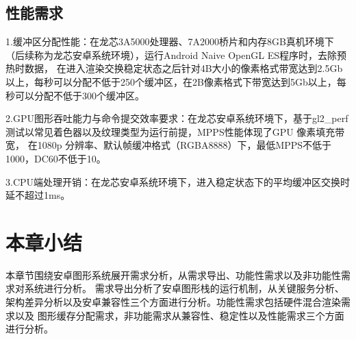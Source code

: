 \subsection{性能需求}

1.​缓冲区分配​性能：在龙芯3A5000处理器、7A2000桥片和内存8GB真机环境下（后续称为龙芯安卓系统环境），运行Android Naive OpenGL ES程序时，去除预热时数据，
在进入渲染交换稳定状态之后针对4B大小的像素格式带宽达到2.5Gb以上，每秒可以分配不低于250个缓冲区，在2B像素格式下带宽达到5Gb以上，每秒可以分配不低于300个缓冲区。

2.GPU图形吞吐能力与命令提交效率要求：在龙芯安卓系统环境下，基于gl2\_perf测试以常见着色器以及纹理类型为运行前提，MPPS性能体现了GPU 像素填充带宽，
在1080p 分辨率、默认帧缓冲格式（RGBA8888）下，最低MPPS不低于1000，DC60不低于10。

3.CPU端处理开销：在龙芯安卓系统环境下，进入稳定状态下的平均缓冲区交换时延不超过1ms。

\section{本章小结}
本章节围绕安卓图形系统展开需求分析，从需求导出、功能性需求以及非功能性需求对系统进行分析。
需求导出分析了安卓图形栈的运行机制，从关键服务分析、架构差异分析以及安卓兼容性三个方面进行分析。功能性需求包括硬件混合渲染需求以及
图形缓存分配需求，非功能需求从兼容性、稳定性以及性能需求三个方面进行分析。


